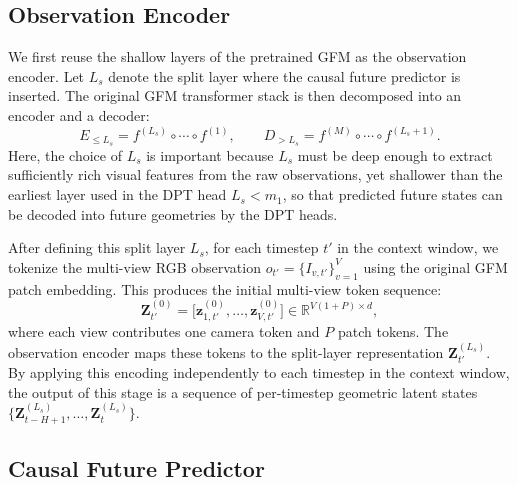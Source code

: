 \documentclass{llmxive}
\begin{document}
\subsection{Observation Encoder}
\label{sec:method:encoding}
We first reuse the shallow layers of the pretrained GFM as the observation encoder. Let $L_s$ denote the split layer where the causal future predictor is inserted. The original GFM transformer stack is then decomposed into an encoder and a decoder:
\begin{equation}
    E_{\leq L_s}
    =
    f^{(L_s)}
    \circ
    \cdots
    \circ
    f^{(1)},
    \qquad
    D_{> L_s}
    =
    f^{(M)}
    \circ
    \cdots
    \circ
    f^{(L_s+1)} .
\end{equation}
Here, the choice of $L_s$ is important because $L_s$ must be deep enough to extract sufficiently rich visual features from the raw observations, yet shallower than the earliest layer used in the DPT head $L_s < m_1$, so that predicted future states can be decoded into future geometries by the DPT heads.

After defining this split layer $L_s$, for each timestep $t'$ in the context window, we tokenize the multi-view RGB observation $o_{t'}=\{I_{v,t'}\}_{v=1}^{V}$ using the original GFM patch embedding. This produces the initial multi-view token sequence:
\begin{equation}
    \mathbf{Z}_{t'}^{(0)}
    =
    \big[
        \mathbf{z}_{1,t'}^{(0)},\ldots,
        \mathbf{z}_{V,t'}^{(0)}
    \big]
    \in
    \mathbb{R}^{V(1+P)\times d},
\end{equation}
where each view contributes one camera token and $P$ patch tokens. The observation encoder maps these tokens to the split-layer representation $\mathbf{Z}_{t'}^{(L_s)}$. By applying this encoding independently to each timestep in the context window, the output of this stage is a sequence of per-timestep geometric latent states $\{\mathbf{Z}_{t-H+1}^{(L_s)},\ldots,\mathbf{Z}_{t}^{(L_s)}\}$.



\subsection{Causal Future Predictor}
\label{sec:method:predictor}
\end{document}
